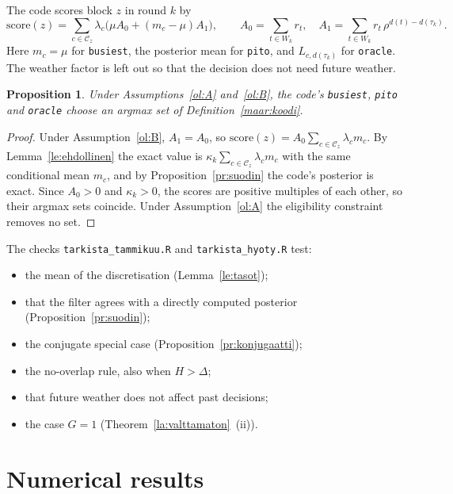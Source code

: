 \documentclass[11pt,a4paper]{article}
\theoremstyle{plain}
\newtheorem{propositio}{Proposition}
\theoremstyle{definition}
\theoremstyle{remark}
\newcommand{\cC}{\mathcal{C}}
\newcommand{\1}{\mathbf{1}}
\newcommand{\pol}[1]{\texttt{#1}}
\begin{document}
The code scores block $z$ in round $k$ by
\[
  \mathrm{score}(z) = \sum_{c \in \cC_z}\lambda_c\bigl(\mu A_0 + (m_c - \mu)A_1\bigr),
  \qquad A_0 = \sum_{t \in W_k} r_t,\quad A_1 = \sum_{t \in W_k} r_t\,\rho^{d(t) - d(\tau_k)}.
\]
Here $m_c = \mu$ for \pol{busiest}, the posterior mean for \pol{pito}, and
$L_{c,d(\tau_k)}$ for \pol{oracle}. The weather factor is left out so that the
decision does not need future weather.

\begin{propositio}
Under Assumptions~\ref{ol:A} and~\ref{ol:B}, the code's \pol{busiest},
\pol{pito} and \pol{oracle} choose an argmax set of Definition~\ref{maar:koodi}.
\end{propositio}

\begin{proof}
Under Assumption~\ref{ol:B}, $A_1 = A_0$, so
$\mathrm{score}(z) = A_0\sum_{c \in \cC_z}\lambda_c m_c$. By
Lemma~\ref{le:ehdollinen} the exact value is $\kappa_k\sum_{c \in \cC_z}\lambda_c m_c$
with the same conditional mean $m_c$, and by Proposition~\ref{pr:suodin} the
code's posterior is exact. Since $A_0 > 0$ and $\kappa_k > 0$, the scores are
positive multiples of each other, so their argmax sets coincide. Under
Assumption~\ref{ol:A} the eligibility constraint removes no set.
\end{proof}

The checks \texttt{tarkista\_tammikuu.R} and \texttt{tarkista\_hyoty.R} test:
\begin{itemize}
  \item the mean of the discretisation (Lemma~\ref{le:tasot});
  \item that the filter agrees with a directly computed posterior (Proposition~\ref{pr:suodin});
  \item the conjugate special case (Proposition~\ref{pr:konjugaatti});
  \item the no-overlap rule, also when $H > \Delta$;
  \item that future weather does not affect past decisions;
  \item the case $G = 1$ (Theorem~\ref{la:valttamaton}~(ii)).
\end{itemize}

\section{Numerical results}\label{sec:numeeriset}
\end{document}
